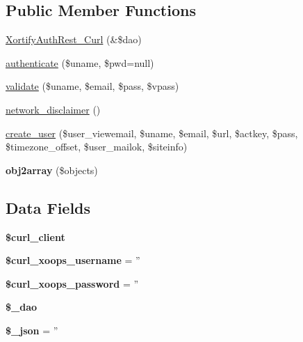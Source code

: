 \subsection*{Public Member Functions}
\begin{DoxyCompactItemize}
\item 
\hyperlink{class_xortify_auth_rest___curl_af9b64b3967386563a2384fba32486ad2}{Xortify\-Auth\-Rest\-\_\-\-Curl} (\&\$dao)
\item 
\hyperlink{class_xortify_auth_rest___curl_a00678ba307326b734e6c679f28bea315}{authenticate} (\$uname, \$pwd=null)
\item 
\hyperlink{class_xortify_auth_rest___curl_a91121a1b702dfd20fb65a027c8ed26ec}{validate} (\$uname, \$email, \$pass, \$vpass)
\item 
\hyperlink{class_xortify_auth_rest___curl_a1874c27b6f81a3f2ff9015405ad0f8bc}{network\-\_\-disclaimer} ()
\item 
\hyperlink{class_xortify_auth_rest___curl_ac72efc5ad313a592cf6706876f56f7ec}{create\-\_\-user} (\$user\-\_\-viewemail, \$uname, \$email, \$url, \$actkey, \$pass, \$timezone\-\_\-offset, \$user\-\_\-mailok, \$siteinfo)
\item 
\hypertarget{class_xortify_auth_rest___curl_aabc52e4f78557f0e0b360a8aaba6e11d}{{\bfseries obj2array} (\$objects)}\label{class_xortify_auth_rest___curl_aabc52e4f78557f0e0b360a8aaba6e11d}

\end{DoxyCompactItemize}
\subsection*{Data Fields}
\begin{DoxyCompactItemize}
\item 
\hypertarget{class_xortify_auth_rest___curl_a402f2112991f3227835af80e9df33e38}{{\bfseries \$curl\-\_\-client}}\label{class_xortify_auth_rest___curl_a402f2112991f3227835af80e9df33e38}

\item 
\hypertarget{class_xortify_auth_rest___curl_aab7480ba9f878a02b2c9fd43922fa070}{{\bfseries \$curl\-\_\-xoops\-\_\-username} = ''}\label{class_xortify_auth_rest___curl_aab7480ba9f878a02b2c9fd43922fa070}

\item 
\hypertarget{class_xortify_auth_rest___curl_a6c9851541ed3826c67cfe7224c38f0b8}{{\bfseries \$curl\-\_\-xoops\-\_\-password} = ''}\label{class_xortify_auth_rest___curl_a6c9851541ed3826c67cfe7224c38f0b8}

\item 
\hypertarget{class_xortify_auth_rest___curl_a12a029c610f699b4b25e79a1f64a3485}{{\bfseries \$\-\_\-dao}}\label{class_xortify_auth_rest___curl_a12a029c610f699b4b25e79a1f64a3485}

\item 
\hypertarget{class_xortify_auth_rest___curl_a94787b37d92a2dee02534eed4f316589}{{\bfseries \$\-\_\-json} = ''}\label{class_xortify_auth_rest___curl_a94787b37d92a2dee02534eed4f316589}

\end{DoxyCompactItemize}


